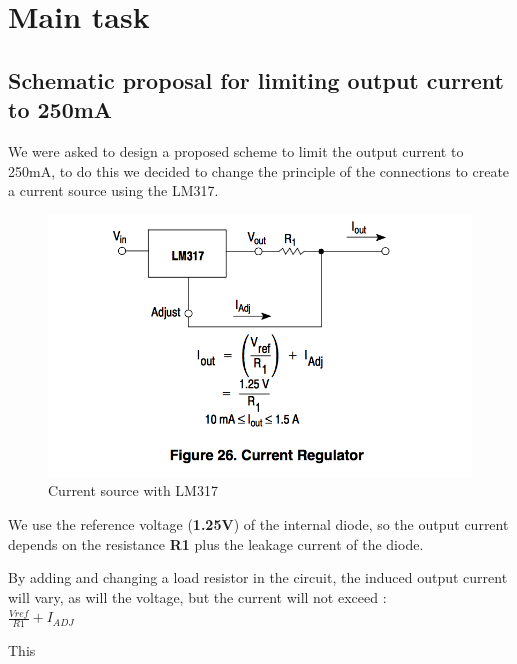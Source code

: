 \section{Main task}
\subsection{Schematic proposal for limiting output current to 250mA} \label{ssec:num11}
{
	We were asked to design a proposed scheme to limit the output current to 250mA, to do this we decided to change the principle of the connections to create a current source using the LM317.	
	
	\begin{figure}[h]
		\centering
		\includegraphics[width=0.7\linewidth]{../Figures/Partie2/SourceCourant}
		\caption{Current source with LM317}
		\label{fig:sourcecourant}
	\end{figure}
	
	We use the reference voltage (\textbf{1.25V}) of the internal diode, so the output current depends on the resistance \textbf{R1} plus the leakage current of the diode.
	
	By adding and changing a load resistor in the circuit, the induced output current will vary, as will the voltage, but the current will not exceed : \\ $\frac{Vref}{R1}+I_{ADJ}$
	
	This 
	
}

\newpage
